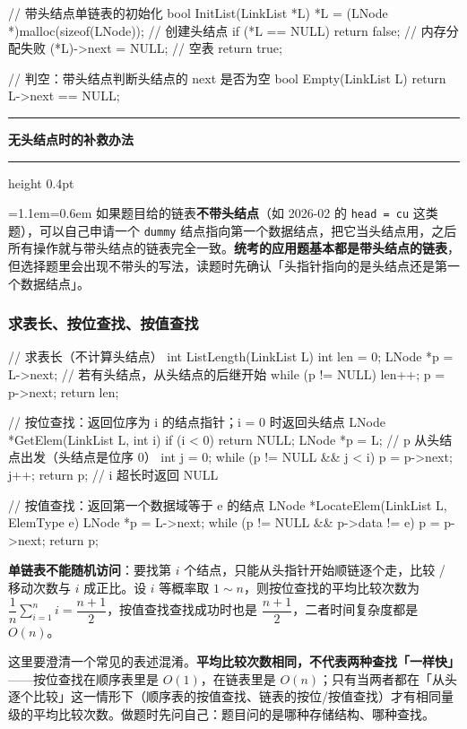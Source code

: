 \documentclass[11pt,openany,UTF8]{ctexbook}
\newcommand{\callouthead}[2]{%
  \par\addvspace{7pt}\noindent
  {\color{#1}\rule[-0.15em]{3pt}{1.05em}}\hspace{0.5em}%
  {\bfseries\color{#1}#2}\par\nobreak\vspace{-0.35em}%
  {\color{rulesep}\hrule height 0.4pt}\nobreak\vspace{0.45em}%
  \begingroup\small\setlength{\parindent}{0pt}%
  \leftskip=1.1em\rightskip=0.6em\noindent\ignorespaces}
\newcommand{\calloutend}{\par\endgroup\addvspace{7pt}}
\newenvironment{callwarn}[1]{\callouthead{warnbar}{#1}}{\calloutend}
\begin{document}
\begin{codebox}
// 带头结点单链表的初始化
bool InitList(LinkList *L) {
    *L = (LNode *)malloc(sizeof(LNode));  // 创建头结点
    if (*L == NULL) return false;         // 内存分配失败
    (*L)->next = NULL;                    // 空表
    return true;
}

// 判空：带头结点判断头结点的 next 是否为空
bool Empty(LinkList L) { return L->next == NULL; }
\end{codebox}

\begin{callwarn}{无头结点时的补救办法}
如果题目给的链表\textbf{不带头结点}（如 2026-02 的 \texttt{head =\allowbreak{} cu} 这类题），可以自己申请一个 \texttt{dummy} 结点指向第一个数据结点，把它当头结点用，之后所有操作就与带头结点的链表完全一致。\textbf{统考的应用题基本都是带头结点的链表}，但选择题里会出现不带头的写法，读题时先确认「头指针指向的是头结点还是第一个数据结点」。

\end{callwarn}

\subsubsection{求表长、按位查找、按值查找}

\begin{codebox}
// 求表长（不计算头结点）
int ListLength(LinkList L) {
    int len = 0;
    LNode *p = L->next;          // 若有头结点，从头结点的后继开始
    while (p != NULL) { len++; p = p->next; }
    return len;
}

// 按位查找：返回位序为 i 的结点指针；i = 0 时返回头结点
LNode *GetElem(LinkList L, int i) {
    if (i < 0) return NULL;
    LNode *p = L;                // p 从头结点出发（头结点是位序 0）
    int j = 0;
    while (p != NULL && j < i) { p = p->next; j++; }
    return p;                    // i 超长时返回 NULL
}

// 按值查找：返回第一个数据域等于 e 的结点
LNode *LocateElem(LinkList L, ElemType e) {
    LNode *p = L->next;
    while (p != NULL && p->data != e) p = p->next;
    return p;
}
\end{codebox}

\textbf{单链表不能随机访问}：要找第 $i$ 个结点，只能从头指针开始顺链逐个走，比较 / 移动次数与 $i$ 成正比。设 $i$ 等概率取 $1 \sim n$，则按位查找的平均比较次数为 $\dfrac{1}{n}\sum_{i=1}^{n} i = \dfrac{n+1}{2}$，按值查找查找成功时也是 $\dfrac{n+1}{2}$，二者时间复杂度都是 $O(n)$。

这里要澄清一个常见的表述混淆。\textbf{平均比较次数相同，不代表两种查找「一样快」}——按位查找在顺序表里是 $O(1)$，在链表里是 $O(n)$；只有当两者都在「从头逐个比较」这一情形下（顺序表的按值查找、链表的按位/按值查找）才有相同量级的平均比较次数。做题时先问自己：题目问的是哪种存储结构、哪种查找。
\end{document}
